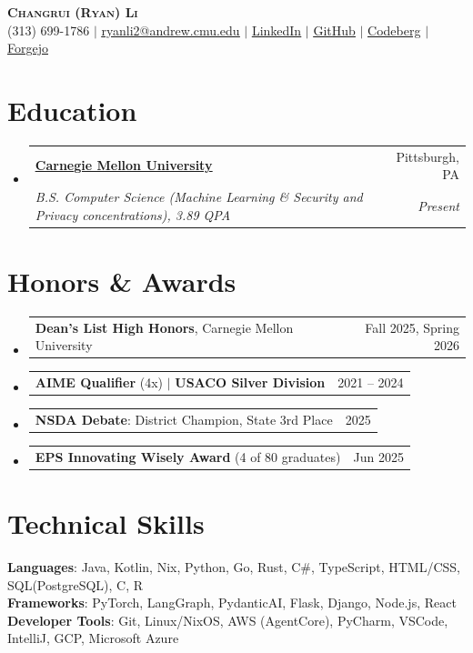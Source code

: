 \documentclass[letterpaper,11pt]{article}
\makeatletter
\newcommand{\resumeSubheading}[4]{
  \vspace{-2pt}\item
    \begin{tabular*}{0.97\textwidth}[t]{l@{\extracolsep{\fill}}r}
      \textbf{#1} & #2 \\
      \textit{\small#3} & \textit{\small #4} \\
    \end{tabular*}\vspace{-7pt}
}
\newcommand{\resumeAwardHeading}[2]{
    \item
    \begin{tabular*}{0.97\textwidth}{l@{\extracolsep{\fill}}r}
      \small#1 & #2 \\
    \end{tabular*}\vspace{-7pt}
}
\newcommand{\resumeSubHeadingListStart}{\begin{itemize}[leftmargin=0.15in, label={}]}
\newcommand{\resumeSubHeadingListEnd}{\end{itemize}}
\makeatother
\begin{document}
\begin{center}
    \textbf{\Huge \scshape Changrui (Ryan) Li} \\ \vspace{1pt}
    \small (313) 699-1786 $|$ \href{mailto:ryanli2@andrew.cmu.edu}{\underline{ryanli2@andrew.cmu.edu}} $|$ \href{https://www.linkedin.com/in/ryan-li-ab139919b/}{\underline{LinkedIn}} $|$
    \href{https://github.com/thesuperRL}{\underline{GitHub}} $|$
    \href{https://codeberg.org/thesuperRL}{\underline{Codeberg}} $|$
    \href{https://git.cmu.dev/thesuperRL}{\underline{Forgejo}}
\end{center}

\section{Education}
  \resumeSubHeadingListStart
      \resumeSubheading
              {\href{https://www.cmu.edu/}{\underline{Carnegie Mellon University}} }{Pittsburgh, PA}
              {B.S. Computer Science (Machine Learning \& Security and Privacy concentrations), 3.89 QPA}{Present}
  \resumeSubHeadingListEnd

\section{Honors \& Awards}
  \resumeSubHeadingListStart
    \resumeAwardHeading{\textbf{Dean's List High Honors}, Carnegie Mellon University}{Fall 2025, Spring 2026}
    \resumeAwardHeading{\textbf{AIME Qualifier} (4x) $|$ \textbf{USACO Silver Division}}{2021 -- 2024}
    \resumeAwardHeading{\textbf{NSDA Debate}: District Champion, State 3rd Place}{2025}
    \resumeAwardHeading{\textbf{EPS Innovating Wisely Award} (4 of 80 graduates)}{Jun 2025}
  \resumeSubHeadingListEnd

\section{Technical Skills}
 \begin{itemize}[leftmargin=0.15in, label={}]
    \small{\item{
     \textbf{Languages}{: Java, Kotlin, Nix, Python, Go, Rust, C\#, TypeScript, HTML/CSS, SQL(PostgreSQL), C, R} \\
     \textbf{Frameworks}{: PyTorch, LangGraph, PydanticAI, Flask, Django, Node.js, React} \\
     \textbf{Developer Tools}{: Git, Linux/NixOS, AWS (AgentCore), PyCharm, VSCode, IntelliJ, GCP, Microsoft Azure} \\
    }}
 \end{itemize}
\end{document}
